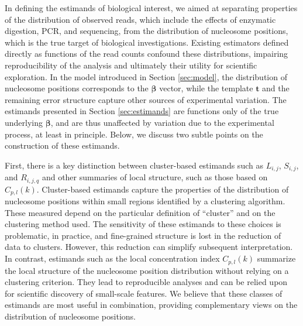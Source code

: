 In defining the estimands of biological interest, we aimed at separating properties of the distribution of observed reads, which include the effects of enzymatic digestion, PCR, and sequencing, from  the distribution of nucleosome positions, which is the true target of biological investigations.
Existing estimators defined directly as functions of the read counts confound these distributions, impairing reproducibility of the analysis and ultimately their utility for scientific exploration.
In the model introduced in Section \ref{sec:model}, the distribution of nucleosome positions corresponds to the $\bm \beta$ vector, while the template $\bm{t}$ and the remaining error structure capture other sources of experimental variation.
The estimands presented in Section \ref{sec:estimands} are functions only of the true underlying $\bm \beta$, and are thus unaffected by variation due to the experimental process, at least in principle.
Below, we discuss two subtle points on the construction of these estimands.

First, there is a key distinction between cluster-based estimands such as $L_{i,j}$, $S_{i,j}$, and $R_{i,j,q}$ and other summaries of local structure, such as those based on $C_{p,l}(k)$.
Cluster-based estimands capture the properties of the distribution of nucleosome positions within small regions identified by a clustering algorithm.
These measured depend on the particular definition of ``cluster'' and on the clustering method used.
The sensitivity of these estimands to these choices is problematic, in practice, and fine-grained structure is lost in the reduction of data to clusters.
However, this reduction can simplify subsequent interpretation.
%
In contrast, estimands such as the local concentration index $C_{p,l}(k)$ summarize the local structure of the nucleosome position distribution without relying on a clustering criterion.
They lead to reproducible analyses and can be relied upon for scientific discovery of small-scale features.
%
We believe that these classes of estimands are most useful in combination, providing complementary views on the distribution of nucleosome positions.

